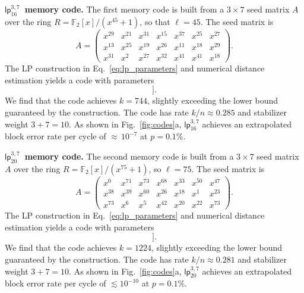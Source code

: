 \documentclass[reprint,twocolumn,secnumarabic,amssymb, aps, prx]{revtex4-2}
\newcommand{\lpmemmed}{\mbox{$\mathsf{lp}^{3, 7}_{20}$}}
\newcommand{\lpmemsmall}{\mbox{$\mathsf{lp}^{3, 7}_{16}$}}
\begin{document}
\medskip
\noindent\textbf{\lpmemsmall\ memory code.}
The first memory code is built from a $3 \times 7$ seed matrix $A$ over the ring \mbox{$R = \mathbb{F}_2[x]/(x^{45}+1)$}, so that $\ell = 45$. The seed matrix is
\begin{equation}\label{eq:seed_lp16}
  A = \begin{pmatrix}
    x^{29} & x^{21} & x^{31} & x^{15} & x^{37} & x^{25} & x^{27} \\
    x^{13} & x^{25} & x^{19} & x^{26} & x^{11} & x^{18} & x^{29} \\
    x^{31} & x^{2}  & x^{27} & x^{32} & x^{41} & x^{41} & x^{18}
  \end{pmatrix}.
\end{equation}
The LP construction in Eq.~\eqref{eq:lp_parameters} and numerical distance estimation yields a code with parameters\begin{equation}
  [[n = 2610, \quad k \geq 720, \quad d \leq 16\,]].
\end{equation}
We find that the code achieves $k = 744$, slightly exceeding the lower bound guaranteed by the construction. The code has rate $k/n \approx 0.285$ and stabilizer weight $3+7 = 10$. As shown in Fig.~\ref{fig:codes}a, $\lpmemsmall$ achieves an extrapolated block error rate per cycle of $\approx$\,$10^{-7}$ at $p=0.1\%$.

\medskip
\noindent\textbf{\lpmemmed\ memory code.}
The second memory code is built from a $3 \times 7$ seed matrix $A$ over the ring \mbox{$R = \mathbb{F}_2[x]/(x^{75}+1)$}, so $\ell = 75$. The seed matrix is
\begin{equation}\label{eq:seed_lp22}
  A = \begin{pmatrix}
    x^{0}  & x^{71} & x^{73} & x^{68} & x^{33} & x^{50} & x^{47} \\
    x^{38} & x^{39} & x^{60} & x^{26} & x^{18} & x^{1}  & x^{23} \\
    x^{73} & x^{6}  & x^{5}  & x^{42} & x^{20} & x^{22} & x^{73}
  \end{pmatrix}.
\end{equation}
The LP construction in Eq.~\eqref{eq:lp_parameters} and numerical distance estimation yields a code with parameters
\begin{equation}
  [[n = 4350, \quad k \geq 1200, \quad d \leq 20\,]].
\end{equation}
We find that the code achieves $k = 1224$, slightly exceeding the lower bound guaranteed by the construction. The code has rate $k/n \approx 0.281$ and stabilizer weight $3 + 7 = 10$. As shown in Fig.~\ref{fig:codes}a, $\lpmemmed$ achieves an extrapolated block error rate per cycle of $\lesssim 10^{-10}$ at $p=0.1\%$.
\end{document}
